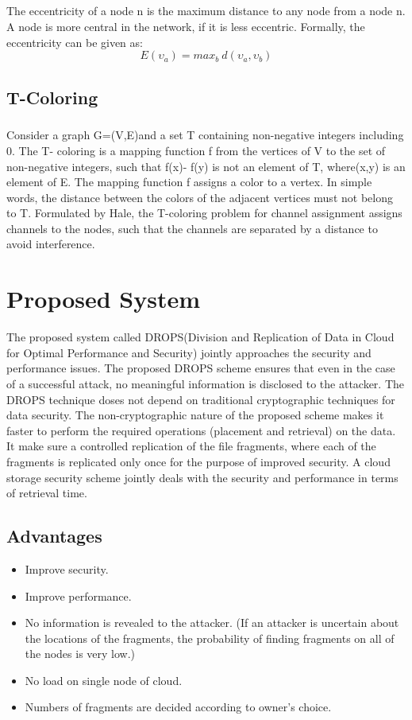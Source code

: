 \paragraph{}
The eccentricity of a node n is the maximum distance to any node from a node n. A
node is more central in the network, if it is less eccentric. Formally, the eccentricity can be
given as:
$$ E(\upsilon_{a}) = max _{b} \ d(\upsilon_{a},\upsilon_{b}) $$
\section{T-Coloring}
\paragraph{}
Consider a graph G=(V,E)and a set T containing non-negative integers including 0.
The T- coloring is a mapping function f from the vertices of V to the set of non-negative
integers, such that f(x)- f(y) is not an element of T, where(x,y) is an element of E. The
mapping function f assigns a color to a vertex. In simple words, the distance between the
colors of the adjacent vertices must not belong to T. Formulated by Hale, the T-coloring
problem for channel assignment assigns channels to the nodes, such that the channels are
separated by a distance to avoid interference.

\chapter{Proposed System}
The proposed system called DROPS(Division and Replication of Data in Cloud for Optimal Performance and Security) jointly approaches the security and performance issues. The proposed DROPS scheme ensures that even in the case of a successful attack, no meaningful information is disclosed to the attacker. The DROPS technique doses not depend on traditional cryptographic techniques for data security. The non-cryptographic nature of the proposed scheme makes it faster to perform the required operations (placement and retrieval) on the data. It make sure a controlled replication of the file fragments,
where each of the fragments is replicated only once for the purpose of improved security.
A cloud storage security scheme jointly deals with the security and performance in terms
of retrieval time.
\section{Advantages}
\begin{itemize}
	\item  Improve security.
	\item  Improve performance. 
	\item  No information is revealed to the attacker. (If an attacker is uncertain about the locations of the fragments, the probability of finding fragments on all of the nodes is very low.)
	\item  No load on single node of cloud.
	\item  Numbers of fragments are decided according to owner’s choice.
\end{itemize}
